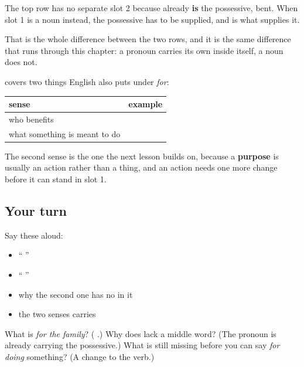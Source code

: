 The top row has no separate slot 2 because \textbf{} already \textbf{is} the possessive, bent. When slot 1 is a noun instead, the possessive has to be supplied, and \textbf{} is what supplies it.

That is the whole difference between the two rows, and it is the same difference that runs through this chapter: a pronoun carries its own \textbf{} inside itself, a noun does not.

\begin{grammarlens}[title={Grammar Lens: what \emph{for} covers}]
\textbf{ } covers two things English also puts under \emph{for}:

\noindent
\begin{tabularx}{\linewidth}{@{}>{\raggedright\arraybackslash}X>{\raggedright\arraybackslash}X@{}}
\toprule
\textbf{sense} & \textbf{example} \\
\midrule
who benefits & \hi{यह} \hi{परिवार} \hi{के} \hi{लिए} \hi{है।} \\
what something is meant to do & \hi{यह} \hi{चाय} \hi{के} \hi{लिए} \hi{है।} \\
\bottomrule
\end{tabularx}

The second sense is the one the next lesson builds on, because a \textbf{purpose} is usually an action rather than a thing, and an action needs one more change before it can stand in slot 1.
\end{grammarlens}

\subsection*{Your turn}
Say these aloud:

\begin{itemize}
\raggedright
  \item \textquotedblleft{}    \textquotedblright{}
  \item \textquotedblleft{}   \textquotedblright{}
  \item why the second one has no \textbf{} in it
  \item the two senses \textbf{ } carries
\end{itemize}

\begin{tcolorbox}[breakable,colback=teal!4,colframe=teal!35!black,title={Before you move on}]
What is \emph{for the family}? (\textbf{  }.) Why does \textbf{ } lack a middle word? (The pronoun is already carrying the possessive.) What is still missing before you can say \emph{for doing} something? (A change to the verb.)
\end{tcolorbox}
